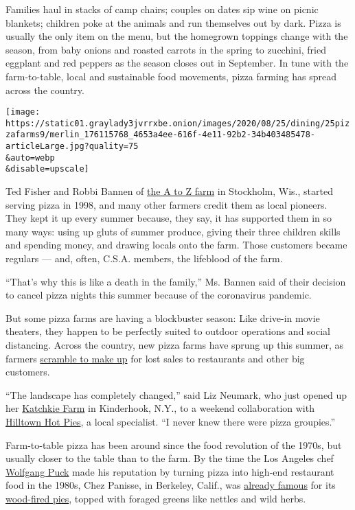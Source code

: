 Families haul in stacks of camp chairs; couples on dates sip wine on
picnic blankets; children poke at the animals and run themselves out by
dark. Pizza is usually the only item on the menu, but the homegrown
toppings change with the season, from baby onions and roasted carrots in
the spring to zucchini, fried eggplant and red peppers as the season
closes out in September. In tune with the farm-to-table, local and
sustainable food movements, pizza farming has spread across the country.

\texttt{[image: https://static01.graylady3jvrrxbe.onion/images/2020/08/25/dining/25pizzafarms9/merlin\_176115768\_4653a4ee-616f-4e11-92b2-34b403485478-articleLarge.jpg?quality=75\\\&auto=webp\\\&disable=upscale]}

Ted Fisher and Robbi Bannen of
\href{https://atozproduceandbakery.com/}{the A to Z farm} in Stockholm,
Wis., started serving pizza in 1998, and many other farmers credit them
as local pioneers. They kept it up every summer because, they say, it
has supported them in so many ways: using up gluts of summer produce,
giving their three children skills and spending money, and drawing
locals onto the farm. Those customers became regulars --- and, often,
C.S.A. members, the lifeblood of the farm.

``That's why this is like a death in the family,'' Ms. Bannen said of
their decision to cancel pizza nights this summer because of the
coronavirus pandemic.

But some pizza farms are having a blockbuster season: Like drive-in
movie theaters, they happen to be perfectly suited to outdoor operations
and social distancing. Across the country, new pizza farms have sprung
up this summer, as farmers
\href{https://www.nytimes3xbfgragh.onion/2020/04/09/dining/farm-to-table-coronavirus.html}{scramble
to make up} for lost sales to restaurants and other big customers.

``The landscape has completely changed,'' said Liz Neumark, who just
opened up her \href{https://www.katchkiefarm.com/}{Katchkie Farm} in
Kinderhook, N.Y., to a weekend collaboration with
\href{https://www.instagram.com/hilltownhotpies/}{Hilltown Hot Pies}, a
local specialist. ``I never knew there were pizza groupies.''

Farm-to-table pizza has been around since the food revolution of the
1970s, but usually closer to the table than to the farm. By the time the
Los Angeles chef
\href{https://www.nytimes3xbfgragh.onion/2012/10/31/dining/wolfgang-puck-the-original-celebrity-chef-is-still-keeping-busy.html}{Wolfgang
Puck} made his reputation by turning pizza into high-end restaurant food
in the 1980s, Chez Panisse, in Berkeley, Calif., was
\href{https://www.nytimes3xbfgragh.onion/1984/07/08/magazine/getting-to-know-calzone.html}{already
famous} for its
\href{https://food52.com/blog/25282-my-family-recipe-coming-home-pizza-dough}{wood-fired
pies}, topped with foraged greens like nettles and wild herbs.

